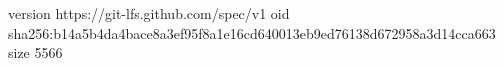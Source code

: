 version https://git-lfs.github.com/spec/v1
oid sha256:b14a5b4da4bace8a3ef95f8a1e16cd640013eb9ed76138d672958a3d14cca663
size 5566
